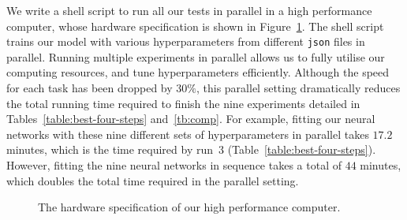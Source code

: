 We write a shell script to run all our tests in parallel in a high performance computer, whose hardware specification is shown in Figure~\ref{fig:hardware}. The shell script trains our model with various hyperparameters from different 
\texttt{json} files in parallel. 
Running multiple experiments in parallel allows us to fully utilise our computing resources, and tune hyperparameters efficiently. Although the speed for each task has been dropped by $30\%$, this parallel setting dramatically reduces the total running time required to finish the nine experiments detailed in Tables~\ref{table:best-four-steps} and~\ref{tb:comp}. For example, fitting our neural networks with these nine different sets of hyperparameters in parallel takes $17.2$ minutes, which is the time required by run~3 (Table~\ref{table:best-four-steps}). However, fitting the nine neural networks in sequence takes a total of $44$ minutes, which doubles the total time required in the parallel setting.\begin{figure}
    \caption{The hardware specification of our high performance computer.}
    \label{fig:hardware}
\end{figure}


